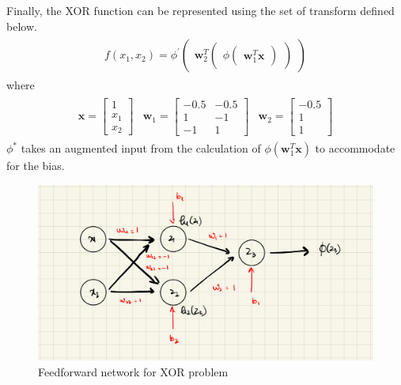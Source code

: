 Finally, the XOR function can be represented using the set of transform defined below.
\begin{align}
  \begin{matrix}
    f(x_1,x_2) = \phi^{'} \begin{pmatrix}
    \textbf{w}_2^T 
    \begin{pmatrix}
      \phi \begin{pmatrix}
        \textbf{w}_1^T\textbf{x}
    \end{pmatrix}  
  \end{pmatrix}
  \end{pmatrix}
\end{matrix}
\end{align}
where
\begin{align}
  \begin{matrix}
  \textbf{x} = \begin{bmatrix}
    1 \\
    x_1 \\
    x_2
  \end{bmatrix} & \textbf{w}_1 = \begin{bmatrix}
    -0.5 & -0.5 \\
    1 & -1  \\
    -1 & 1 
  \end{bmatrix} & \textbf{w}_2 = \begin{bmatrix}
    -0.5 \\
    1 \\
    1
  \end{bmatrix} 
  \end{matrix}
\end{align}
$\phi^{*}$ takes an augmented input from the calculation of $\phi(\textbf{w}_1^T \textbf{x})$ to accommodate for the bias.
\begin{figure}[ht]
  \centering
  \includegraphics[scale=0.15]{CHAPTER_2/c2_fig_XOR_final.jpeg}
  \caption{Feedforward network for XOR problem}
  \label{fig: ffn_XOR_final}
\end{figure}\vspace{30mm}\\
